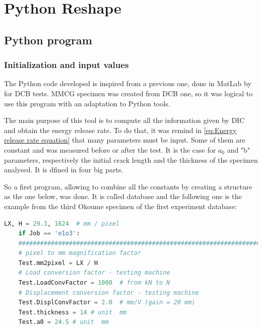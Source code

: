 
\chapter{Python Reshape}
\label{Python Reshape}

\section{Python program}


\subsection{Initialization and input values}

The Python code developed is inspired from a previous one, done in MatLab by \parencite{Reference14} for DCB tests. MMCG specimen was created from DCB one, so it was logical to use this program with an adaptation to Python tools. 

The main purpose of this tool is to compute all the information given by DIC and obtain the energy release rate. To do that, it was remind in \ref{eq:Energy release rate equation} that many parameters must be input. Some of them are constant and was measured before or after the test. It is the case for $a_{0}$ and "b" parameters, respectively the initial crack length and the thickness of the specimen analysed. It is dfined in four big parts.

So a first program, allowing to combine all the constants by creating a structure as the one below, was done. It is called database and the following one is the example from the third Okoume specimen of the first experiment database:


\begin{lstlisting}[language=Python]
	LX, H = 29.3, 1624  # mm / pixel
	if Job == 'e1o3':
	##########################################################################
	# pixel to mm magnification factor
	Test.mm2pixel = LX / H
	# Load conversion factor - testing machine
	Test.LoadConvFactor = 1000  # from kN to N
	# Displacement conversion factor - testing machine
	Test.DisplConvFactor = 2.0  # mm/V (gain = 20 mm)
	Test.thickness = 14 # unit  mm
	Test.a0 = 24.5 # unit  mm
\end{lstlisting}



